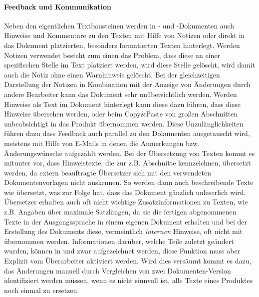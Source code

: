 \paragraph{Feedback und Kommunikation} Neben den eigentlichen Textbausteinen werden in - und -Dokumenten auch Hinweise und Kommentare zu den Texten mit Hilfe von Notizen oder direkt in das Dokument platzierten, besonders formatierten Texten hinterlegt. Werden Notizen verwendet besteht zum einen das Problem, dass diese an einer spezifischen Stelle im Text platziert werden, wird diese Stelle gelöscht, wird damit auch die Notiz ohne einen Warnhinweis gelöscht. Bei der gleichzeitigen Darstellung der Notizen in Kombination mit der Anzeige von Änderungen durch andere Bearbeiter kann das Dokument sehr unübersichtlich werden. Werden Hinweise als Text im Dokument hinterlegt kann diese dazu führen, dass diese Hinweise übersehen werden, oder beim Copy\&Paste von großen Abschnitten unbeabsichtigt in das Produkt übernommen  werden. Diese Unzulänglichkeiten führen dazu dass Feedback auch parallel zu den Dokumenten ausgetauscht wird, meistens mit Hilfe von E-Mails in denen die Anmerkungen bzw. Änderungswünsche aufgezählt werden. Bei der Übersetzung von Texten kommt es mitunter vor, dass Hinweistexte, die zur z.B. Abschnitte kennzeichnen, übersetzt werden, da extern beauftragte Übersetzer sich mit den verwendeten Dokumentenvorlagen nicht auskennen. So werden dann auch beschreibende Texte wie  übersetzt, was zur Folge hat, dass das Dokument gänzlich unleserlich wird. Übersetzer erhalten auch oft nicht wichtige Zusatzinformationen zu Texten, wie z.B. Angaben über maximale Satzlängen, da sie die fertigen abgenommenen Texte in der Ausgangssprache in einem eigenen Dokument erhalten und bei der Erstellung des Dokuments diese, vermeintlich \emph{internen} Hinweise, oft nicht mit übernommen werden.
Informationen darüber, welche Teile zuletzt geändert wurden, können in  und  zwar aufgezeichnet werden, diese Funktion muss aber Explizit vom Überarbeiter aktiviert werden. Wird dies versäumt kommt es dazu, das Änderungen manuell durch Vergleichen von zwei Dokumenten-Version identifiziert werden müssen, wenn es nicht sinnvoll ist, alle Texte eines Produktes noch einmal zu ersetzen.

